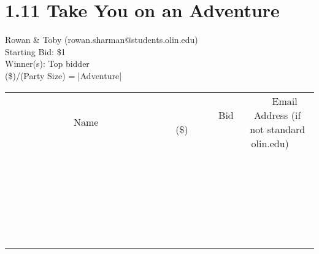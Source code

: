 \documentclass[11pt]{article}
\begin{document}
\section*{1.11 Take You on an Adventure}
Rowan \& Toby (rowan.sharman@students.olin.edu) \\
Starting Bid: \$1 \\
Winner(s): 
Top bidder \\
(\$)/(Party Size) = |Adventure| \\[6ex]
\begin{tabular}{c c c}
~~~~~~~~~~~~~Name~~~~~~~~~~~~~ & ~~~~~~~~~Bid (\$)~~~~~~~~~ & ~~~Email Address (if not standard olin.edu)~~~ \\
 & & \\
\hline
 & & \\
\hline
 & & \\
\hline
 & & \\
\hline
 & & \\
\hline
 & & \\
\hline
 & & \\
\hline
 & & \\
\hline
 & & \\
\hline
 & & \\
\hline
 & & \\
\hline
 & & \\
\hline
 & & \\
\hline
 & & \\
\hline
 & & \\
\hline
 & & \\
\hline
 & & \\
\hline
 & & \\
\hline
 & & \\
\hline
 & & \\
\hline
 & & \\
\hline
 & & \\
\hline
 & & \\
\hline
 & & \\
\hline
 & & \\
\hline
 & & \\
\hline
\end{tabular}
\clearpage
\end{document}
